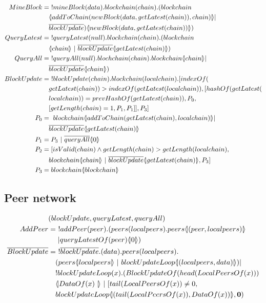 \begin{align*}
    MineBlock &=\ !mineBlock(data).blockchain(chain).(blockchain\\
        &\quad \lift{}{addToChain(newBlock(data,getLatest(chain)),chain)}|\\
        &\quad \overline{blockUpdate})\lift{}{newBlock(data, getLatest(chain))})\\
    QueryLatest &=\ !queryLatest(null).blockchain(chain).(blockchain\\
        &\quad \lift{}{chain}\ |\ \overline{blockUpdate}\lift{}{getLatest(chain)})\\
        QueryAll &=\ !queryAll(null).blochchain(chain).blockchain\lift{}{chain}|\\
        &\quad \overline{blockUpdate}\lift{}{chain})\\
    BlockUpdate &=\ !blockUpdate(chain).blockchain(localchain).[indexOf(\\
        &\quad getLatest(chain))>indexOf(getLatest(localchain)),[hashOf(getLatest(\\
        &\quad localchain))=prevHashOf(getLatest(chain)),P_0,\\
        &\quad [getLength(chain)=1,P_1,P_1]],P_3]\\
    P_0 &=\ blockchain\lift{}{addToChain(getLatest(chain),localchain)}|\\
        &\quad \overline{blockUpdate}\lift{}{getLatest(chain)}\\
    P_1 &= P_3\ |\ \overline{queryAll}\lift{}{0}\\
    P_2 &= [isValid(chain) \land getLength(chain) > getLength(localchain),\\
        &\quad blockchain\lift{}{chain}\ |\ \overline{blockUpdate}\lift{}{getLatest(chain)},P_3]\\
    P_3 &= blockchain\lift{}{blockchain}
\end{align*}

\subsection{Peer network}

\begin{align*}
    &(blockUpdate, queryLatest, queryAll)\\
    AddPeer &=\ !addPeer(peer).(peers(localpeers).peers\lift{}{(peer,localpeers)}\\
        &\quad \ |queryLatestOf(peer)\lift{}{0})\\
    \overline{BlockUpdate} &=\ !\overline{blockUpdate}.(data).peers(localpeers).\\
        &\quad (peers\lift{}{localpeers}\ |\ blockUpdateLoop\lift{}{(localpeers,data)})|\\
        &\quad !blockUpdateLoop(x).(BlockUpdateOf(head(LocalPeersOf(x)))\\
        &\quad \lift{}{DataOf(x)\ }\ |\ [tail(LocalPeersOf(x))\not= 0,\\
        &\quad blockUpdateLoop\lift{}{(tail(LocalPeersOf(x)),DataOf(x))},\nil)
\end{align*}
